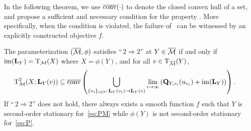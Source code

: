 In the following theorem, we use $\overline{\mathrm{conv}}(\cdot)$ to denote the closed convex hull of a set, and propose a sufficient and necessary condition for the property \twototwo. More specifically, when the condition is violated, the failure of \twototwo\ can be witnessed by an explicitly constructed objective $f$.

\begin{theorem}\label{the:2to2}
    The parameterization $(\overline{\mathcal{M}},\phi)$ satisfies ``\,$2\!\Rightarrow\!2$'' at $Y\in\overline{\mathcal{M}}$ if and only if $\operatorname{im}(\mathrm{\bf L}_Y)=\mathrm{T}_{\mathcal{M}}(X)$ where $X=\phi(Y)$, and for all $v\in\mathrm{T}_{\overline{\mathcal{M}}}(Y)$,
    \begin{equation}\label{eq:nece_suff_2to2}
        \!\!\mathrm{T}^2_{\mathcal{M}}(X;\mathrm{\bf L}_Y(v)) \subseteq \overline{\mathrm{conv}} \left( {\bigcup_{\{v_i\}_{i\in\mathbb{N}}:\,\mathrm{\bf L}_Y(v_i)\to \mathrm{\bf L}_Y(v)}\lim_{i\to\infty}\left( {\mathrm{\bf Q}_{Y,v_i}(u_{v_i}) + \operatorname{im}(\mathrm{\bf L}_{Y})} \right) } \right).
    \end{equation}
    If ``\,$2\!\Rightarrow\!2$'' does not hold, there always exists a smooth function $f$ such that $Y$ is second-order stationary for~\eqref{eq:PM} while $\phi(Y)$ is not second-order stationary for~\eqref{eq:P}.
\end{theorem}


